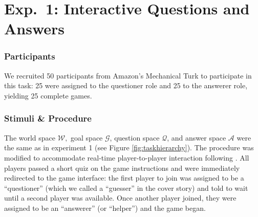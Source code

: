 \documentclass[12pt, floatsintext, jou]{apa6}
\begin{document}

\section{Exp.~1: Interactive Questions and Answers}

\subsubsection{Participants} We recruited 50 participants
from Amazon's Mechanical Turk to participate in this task: 25 were assigned to the  questioner role and 25 to the answerer role, yielding 25 complete games.

\subsubsection{Stimuli \& Procedure} The world space $\mathcal{W},$ goal space $\mathcal{G}$, question space $\mathcal{Q}$, and answer space $\mathcal{A}$ were the same as in experiment 1 (see Figure \ref{fig:taskhierarchy}). The procedure was modified to accommodate real-time player-to-player interaction following . All players passed a short quiz on the game instructions and were immediately redirected to the game interface: the first player to join was assigned to be a ``questioner'' (which we called a ``guesser'' in the cover story) and told to wait until a second player was available. Once another player joined, they were assigned to be an ``answerer'' (or ``helper'') and the game began. 
\end{document}
